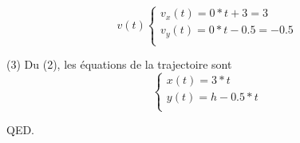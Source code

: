 \documentclass[]{book}
\theoremstyle{definition}
\begin{document}
$$ v(t)
\left\{ 
\begin{array}{l}
v_x(t) = 0*t + 3 = 3 \\
v_y(t) = 0*t - 0.5 = -0.5 \\
\end{array}
\right. 
$$


(3) Du (2), les \'equations de la trajectoire sont
$$
\left\{ 
\begin{array}{l}
x(t) = 3*t \\
y(t) = h - 0.5*t \\
\end{array}
\right. 
$$

QED.
\end{document}
